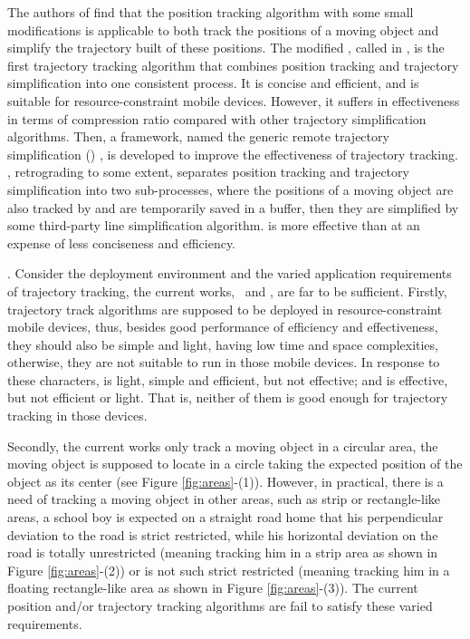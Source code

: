 The authors of \cite{Trajcevski:LDRH} find that the position tracking algorithm \ldr with some small modifications is applicable to both track the positions of a moving object and simplify the trajectory built of these positions. The modified \ldr,  called \ldrh in \cite{Lange:Tracking}, is the first trajectory tracking algorithm that combines position tracking and trajectory simplification into one consistent process. It is concise and efficient, and is suitable for resource-constraint mobile devices. However, it suffers in effectiveness in terms of compression ratio compared with other trajectory simplification algorithms. %
%
Then, a framework, named the generic remote trajectory simplification (\grts) \cite{Lange:GRTS,Lange:Tracking}, is developed to improve the effectiveness of trajectory tracking. \grts, retrograding to some extent, separates position tracking and trajectory simplification into two sub-processes, where the positions of a moving object are also tracked by \ldr and are temporarily saved in a buffer, then they are simplified by some third-party line simplification algorithm. \grts is more effective than \ldrh at an expense of less conciseness and efficiency.
%



. Consider the deployment environment and the varied application requirements of trajectory tracking, the current works, \ie~\ldrh and \grts, are far to be sufficient. Firstly, trajectory track algorithms are supposed to be deployed in resource-constraint mobile devices, thus, besides good performance of efficiency and effectiveness, they should also be simple and light, \ie having low time and space complexities, otherwise, they are not suitable to run in those mobile devices. In response to these characters, \ldrh is light, simple and efficient, but not effective; and \grts is effective, but not efficient or light. That is, neither of them is good enough for trajectory tracking in those devices.

Secondly, the current works only track a moving object in a circular area, \ie the moving object is supposed to locate in a circle taking the expected position of the object as its center (see Figure \ref{fig:areas}-(1)). However, in practical, there is a need of tracking a moving object in other areas, such as strip or rectangle-like areas, \eg a school boy is expected on a straight road home that his perpendicular deviation to the road is strict restricted, while his horizontal deviation on the road is totally unrestricted (meaning tracking him in a strip area as shown in Figure \ref{fig:areas}-(2)) or is not such strict restricted (meaning tracking him in a floating rectangle-like area as shown in Figure \ref{fig:areas}-(3)). The current position and/or trajectory tracking algorithms are fail to satisfy these varied requirements.



